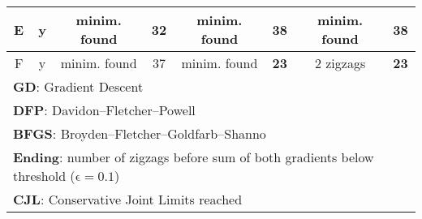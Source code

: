 \begin{table}[!h]
{\begin{tabular}{|c|c|c|c|c|c|c|c|}
			E                                                & y                                    & minim. found           & \cellcolor[HTML]{34FF34}\textbf{32} & minim. found           & 38                                  & minim. found           & 38                                  \\ \hline
			F                                                & y                                    & minim. found           & 37                                  & minim. found           & \cellcolor[HTML]{34FF34}\textbf{23} & 2 zigzags              & \cellcolor[HTML]{34FF34}\textbf{23} \\ \hline
			
			
			\multicolumn{8}{l}{\textbf{GD}: Gradient Descent}\\
			\multicolumn{8}{l}{\textbf{DFP}: Davidon–Fletcher–Powell}\\
			\multicolumn{8}{l}{\textbf{BFGS}: Broyden–Fletcher–Goldfarb–Shanno}\\
			\multicolumn{8}{l}{\textbf{Ending}: number of zigzags before sum of both gradients below threshold ($\mathrm{\epsilon=0.1}$)}\\
			\multicolumn{8}{l}{\textbf{CJL}: Conservative Joint Limits reached}\\
		\end{tabular}%
			} 
\end{table}


